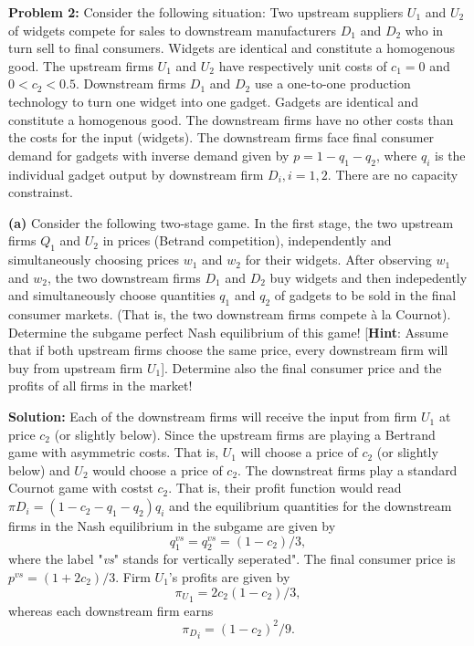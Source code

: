 \documentclass[11pt]{article}
\begin{document}
\vspace{5mm}

\textbf{Problem 2:} Consider the following situation: Two upstream suppliers $U_1$ and $U_2$ of widgets compete for sales to downstream manufacturers $D_1$ and $D_2$ who in turn sell to final consumers. Widgets are identical and constitute a homogenous good. The upstream firms $U_1$ and $U_2$ have respectively unit costs of $c_1=0$ and $0<c_2<0.5$. Downstream firms $D_1$ and $D_2$ use a one-to-one production technology to turn one widget into one gadget. Gadgets are identical and constitute a homogenous good. The downstream firms have no other costs than the costs for the input (widgets). The downstream firms face final consumer demand for gadgets with inverse demand given by $p=1-q_1-q_2$, where $q_i$ is the individual gadget output by downstream firm $D_i, i=1,2$. There are no capacity constrainst.

\vspace{5mm}

\textbf{(a)} Consider the following two-stage game. In the first stage, the two upstream firms $Q_1$ and $U_2$ in prices (Betrand competition), independently and simultaneously choosing prices $w_1$ and $w_2$ for their widgets. After observing $w_1$ and $w_2$, the two downstream firms $D_1$ and $D_2$ buy widgets and then indepedently and simultaneously choose quantities $q_1$ and $q_2$ of gadgets to be sold in the final consumer markets. (That is, the two downstream firms compete à la Cournot). Determine the subgame perfect Nash equilibrium of this game! [\textbf{Hint}: Assume that if both upstream firms choose the same price, every downstream firm will buy from upstream firm $U_1$]. Determine also the final consumer price and the profits of all firms in the market!

\vspace{4mm}

\textbf{Solution:} Each of the downstream firms will receive the input from firm $U_1$ at price $c_2$ (or slightly below). Since the upstream firms are playing a Bertrand game with asymmetric costs. That is, $U_1$ will choose a price of $c_2$ (or slightly below) and $U_2$ would choose a price of $c_2$. The downstreat firms play a standard Cournot game with costst $c_2$. That is, their profit function would read $\pi D_i=(1-c_2-q_1-q_2)q_i$ and the equilibrium quantities for the downstream firms in the Nash equilibrium in the subgame are given by $$q_1^{vs}=q_2^{vs}=(1-c_2)/3,$$ where the label "\textit{vs}" stands for 
vertically seperated". The final consumer price is $p^{vs}=(1+2c_2)/3$. 
Firm $U_1$'s profits are given by $${\pi_U}_1=2c_2(1-c_2)/3,$$ whereas each downstream firm earns $${\pi_D}_i=(1-c_2)^2/9.$$
\end{document}

